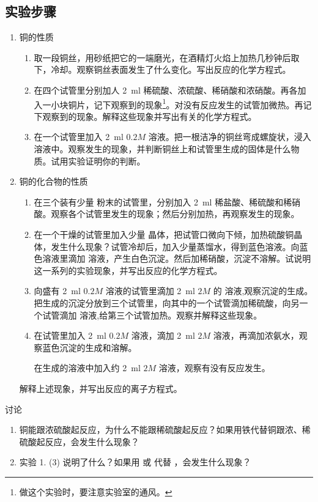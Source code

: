 \subsection*{实验步骤}
\begin{enumerate}[1.]
  \item 铜的性质
  \begin{enumerate}[(1)]
    \item 取一段铜丝，用砂纸把它的一端磨光，在酒精灯火焰上加热几秒钟后取下，冷却。观察铜丝表面发生了什么变化。写出反应的化学方程式。
    \item 在四个试管里分别加人 \qty{2}{ml} 稀硫酸、浓硫酸、稀硝酸和浓硝酸。再各加入一小块铜片，记下观察到的现象\footnote{做这个实验时，要注意实验室的通风。}。对没有反应发生的试管加微热。再记下观察到的现象。解释这些现象并写出有关的化学方程式。
    \item 在一个试管里加入 \qty{2}{ml} $0.2M$  溶液。把一根洁净的铜丝弯成螺旋状，浸入  溶液中。观察发生的现象，并判断铜丝上和试管里生成的固体是什么物质。试用实验证明你的判断。
  \end{enumerate}
  \item 铜的化合物的性质
  \begin{enumerate}
    \item 在三个装有少量  粉末的试管里，分别加入 \qty{2}{ml} 稀盐酸、稀硫酸和稀硝酸。观察各个试管里发生的现象；然后分别加热，再观察发生的现象。
    \item 在一个干燥的试管里加入少量  晶体，把试管口微向下倾，加热硫酸铜晶体，发生什么现象？试管冷却后，加入少量蒸馏水，得到蓝色溶液。向蓝色溶液里滴加  溶液，产生白色沉淀。然后加稀硝酸，沉淀不溶解。试说明这一系列的实验现象，并写出反应的化学方程式。
    \item 向盛有 \qty{2}{ml} $0.2M$  溶液的试管里滴加 \qty{2}{ml} $2M$ 的  溶液,观察沉淀的生成。把生成的沉淀分放到三个试管里，向其中的一个试管滴加稀硫酸，向另一个试管滴加  溶液,给第三个试管加热。观察并解释这些现象。
    \item 在试管里加入 \qty{2}{ml} $0.2M$  溶液，滴加 \qty{2}{ml} $2M$  溶液，再滴加浓氨水，观察蓝色沉淀的生成和溶解。
    
    在生成的溶液中加入约 \qty{2}{ml} $2M$  溶液，观察有没有反应发生。
  \end{enumerate}

  解释上述现象，并写出反应的离子方程式。
\end{enumerate}

\begin{Theorem}{讨论}
  \begin{enumerate}[1.]
    \item 铜能跟浓硫酸起反应，为什么不能跟稀硫酸起反应？如果用铁代替铜跟浓、稀硫酸起反应，会发生什么现象？
    \item 实验 1. (3) 说明了什么？如果用  或  代替 ，会发生什么现象？
  \end{enumerate}
\end{Theorem}

